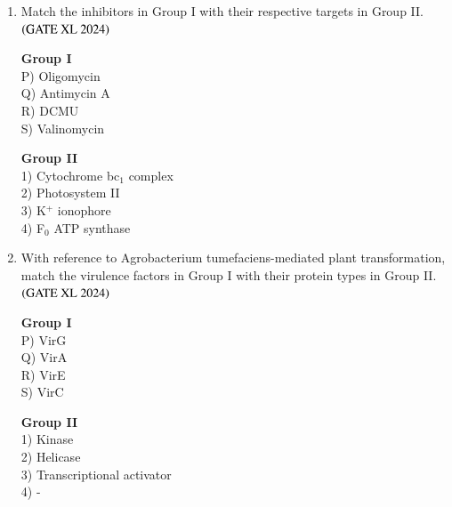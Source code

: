 \documentclass[journal]{IEEEtran}
\begin{document}
\begin{enumerate}
\begin{multicols}{2}
    \columnbreak

    \noindent \textbf{Group II} \\
    1) sepal, sepal, carpel, carpel \\
    2) sepal, petal, petal, sepal \\
    3) carpel, stamen, stamen, carpel \\
    \end{multicols}

    \item Match the inhibitors in Group I with their respective targets in Group II.\hfill $\left(\text{GATE XL 2024}\right)$
    \begin{multicols}{2}
    \noindent \textbf{Group I} \\
    P) Oligomycin \\
    Q) Antimycin A \\
    R) DCMU \\
    S) Valinomycin \\

    \columnbreak

    \noindent \textbf{Group II} \\
    1) Cytochrome bc$_1$ complex \\
    2) Photosystem II \\
    3) K$^+$ ionophore \\
    4) F$_0$ ATP synthase \\
    \end{multicols}

    \item With reference to Agrobacterium tumefaciens-mediated plant transformation, match the virulence factors in Group I with their protein types in Group II.\hfill $\left(\text{GATE XL 2024}\right)$
    \begin{multicols}{2}
    \noindent \textbf{Group I} \\
    P) VirG \\
    Q) VirA \\
    R) VirE \\
    S) VirC \\

    \columnbreak

    \noindent \textbf{Group II} \\
    1) Kinase \\
    2) Helicase \\
    3) Transcriptional activator \\
    4) - \\
    \end{multicols}


\end{enumerate}
\end{document}
